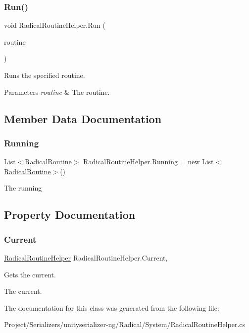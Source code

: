 \subsubsection{\texorpdfstring{Run()}{Run()}}
{\footnotesize\ttfamily void Radical\+Routine\+Helper.\+Run (\begin{DoxyParamCaption}\item[{\hyperlink{class_radical_routine}{Radical\+Routine}}]{routine }\end{DoxyParamCaption})\hspace{0.3cm}{\ttfamily [inline]}}



Runs the specified routine. 


\begin{DoxyParams}{Parameters}
{\em routine} & The routine.\\
\hline
\end{DoxyParams}


\subsection{Member Data Documentation}
\mbox{\label{class_radical_routine_helper_a42746cd71d9b42bc9096a798a9a06764}} 
\subsubsection{\texorpdfstring{Running}{Running}}
{\footnotesize\ttfamily List$<$\hyperlink{class_radical_routine}{Radical\+Routine}$>$ Radical\+Routine\+Helper.\+Running = new List$<$\hyperlink{class_radical_routine}{Radical\+Routine}$>$()}



The running 



\subsection{Property Documentation}
\mbox{\label{class_radical_routine_helper_a7f25af81769f7c98c540ea3a46e7f555}} 
\subsubsection{\texorpdfstring{Current}{Current}}
{\footnotesize\ttfamily \hyperlink{class_radical_routine_helper}{Radical\+Routine\+Helper} Radical\+Routine\+Helper.\+Current\hspace{0.3cm}{\ttfamily [static]}, {\ttfamily [get]}}



Gets the current. 

The current.

The documentation for this class was generated from the following file\+:\begin{DoxyCompactItemize}
\item 
Project/\+Serializers/unityserializer-\/ng/\+Radical/\+System/Radical\+Routine\+Helper.\+cs\end{DoxyCompactItemize}
